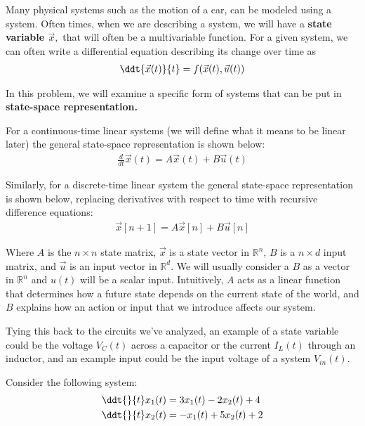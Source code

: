 

Many physical systems such as the motion of a car, can be modeled using a system.
Often times, when we are describing a system, we will have a \textbf{state variable $\vec{x},$}
that will often be a multivariable function.
For a given system, we can often write a differential equation describing its change over time as
\begin{align}
\ddt{\vec{x}(t)}{t} = f(\vec{x}(t), \vec{u}(t))
\end{align}

In this problem, we will examine a specific form of systems that can be put in \textbf{state-space representation.}

For a continuous-time linear systems (we will define what it means to be linear later) the general state-space representation is shown below:
\begin{align}
\frac{d}{dt} \vec{x}(t) = A \vec{x}(t) + B \vec{u}(t)
\end{align}

Similarly, for a discrete-time linear system the general state-space representation is shown below, replacing derivatives with respect to time with recursive difference equations:
\begin{align}
\vec{x}[n + 1] = A \vec{x}[n] + B \vec{u}[n]
\end{align}

Where $A$ is the $n \times n$ state matrix, $\vec{x}$ is a state vector in $\mathbb{R}^n$, $B$ is a $n \times d$ input matrix, and $\vec{u}$ is an input vector in $\mathbb{R}^d$. We will usually consider a $B$ as a vector in $\mathbb{R}^n$ and $u(t)$ will be a scalar input. Intuitively, $A$ acts as a linear function that determines how a future state depends on the current state of the world, and $B$ explains how an action or input that we introduce affects our system.

Tying this back to the circuits we've analyzed, an example of a state variable could be the voltage $V_C(t)$ across a capacitor or the current $I_L(t)$ through an inductor, and an example input could be the input voltage of a system $V_{in}(t)$.

Consider the following system:
\begin{align*}
    \ddt{}{t}x_{1}(t) &= 3 x_{1}(t) - 2 x_{2}(t) + 4 \\
    \ddt{}{t}x_{2}(t) &= - x_{1}(t) + 5 x_{2}(t) + 2
\end{align*}

